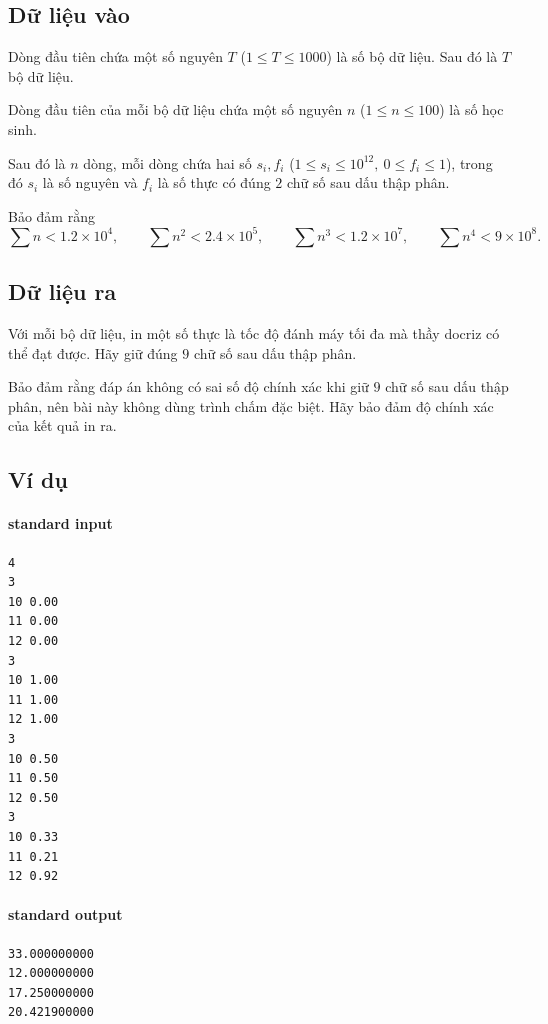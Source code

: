\documentclass[11pt]{article}
\begin{document}
\subsection*{Dữ liệu vào}

Dòng đầu tiên chứa một số nguyên \(T\) (\(1\le T\le 1000\)) là số bộ dữ
liệu. Sau đó là \(T\) bộ dữ liệu.

Dòng đầu tiên của mỗi bộ dữ liệu chứa một số nguyên \(n\) (\(1\le n\le 100\))
là số học sinh.

Sau đó là \(n\) dòng, mỗi dòng chứa hai số \(s_i,f_i\)
(\(1\le s_i\le 10^{12},\ 0\le f_i\le 1\)), trong đó \(s_i\) là số nguyên và
\(f_i\) là số thực có đúng \(2\) chữ số sau dấu thập phân.

Bảo đảm rằng
\[
  \sum n<1.2\times 10^4,\qquad
  \sum n^2<2.4\times 10^5,\qquad
  \sum n^3<1.2\times 10^7,\qquad
  \sum n^4<9\times 10^8.
\]

\subsection*{Dữ liệu ra}

Với mỗi bộ dữ liệu, in một số thực là tốc độ đánh máy tối đa mà thầy docriz
có thể đạt được. Hãy giữ đúng \(9\) chữ số sau dấu thập phân.

Bảo đảm rằng đáp án không có sai số độ chính xác khi giữ \(9\) chữ số sau dấu
thập phân, nên bài này không dùng trình chấm đặc biệt. Hãy bảo đảm độ chính
xác của kết quả in ra.

\subsection*{Ví dụ}

\paragraph{standard input}
\begin{verbatim}
4
3
10 0.00
11 0.00
12 0.00
3
10 1.00
11 1.00
12 1.00
3
10 0.50
11 0.50
12 0.50
3
10 0.33
11 0.21
12 0.92
\end{verbatim}

\paragraph{standard output}
\begin{verbatim}
33.000000000
12.000000000
17.250000000
20.421900000
\end{verbatim}
\end{document}
